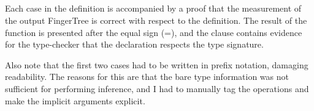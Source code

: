 \documentclass[12pt,twoside,notitlepage]{report}
\begin{document}
\begin{code}
\\
\\
\> \AgdaSymbol{:}  \AgdaSymbol{\{}\AgdaSymbol{\}} \AgdaSymbol{\{} \AgdaSymbol{:}  \AgdaSymbol{\}} \AgdaSymbol{\{} \AgdaSymbol{:}  \AgdaSymbol{\}}\<%
\\
\>[2]\<[6]%
\>[6]  \AgdaSymbol{:}   \<%
\\ 
\>[2]\<[6]%
\>[6]  \AgdaSymbol{:}    \<%
\\
\>[2]\<[6]%
\>[6]\AgdaSymbol{\{} \AgdaSymbol{:} \AgdaSymbol{\}}\<%
\\
\>[2]\<[6]%
\>[6] \AgdaSymbol{(} \AgdaSymbol{:} \AgdaSymbol{)}\<%
\\
\>[2]\<[6]%
\>[6]          \AgdaSymbol{\{}\AgdaSymbol{\}}\<%
\\
\>[2]\<[6]%
\>[6]          \AgdaSymbol{\{}    \AgdaSymbol{\}}\<%
\\
\end{code}
Each case in the definition is accompanied by a proof that the measurement of the output FingerTree is correct with respect to the definition. The result of the function is presented after the equal sign (=), and the  clause contains evidence for the type-checker that the declaration respects the type signature.

Also note that the first two cases had to be written in prefix notation, damaging readability. The reasons for this are that the bare type information was not sufficient for performing inference, and I had to manually tag the operations and make the implicit arguments explicit.
\end{document}
